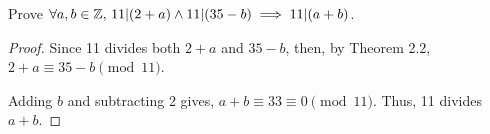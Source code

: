 \documentclass[../hw1]{subfiles}
\begin{document}
\begin{problem}[1]
Prove $\forall a,b\in \mathbb{Z},\, 11|(2+a) \land 11|(35-b) \implies 11|(a+b)$.
\end{problem}
\begin{proof}
	Since 11 divides both $2+a$ and $35-b$, then, by Theorem 2.2, $2+a \equiv 35-b \pmod{11}$.

	Adding $b$ and subtracting 2 gives, $a+b\equiv 33 \equiv 0 \pmod{11}$. Thus, 11 divides $a+b$.
\end{proof}
\end{document}
